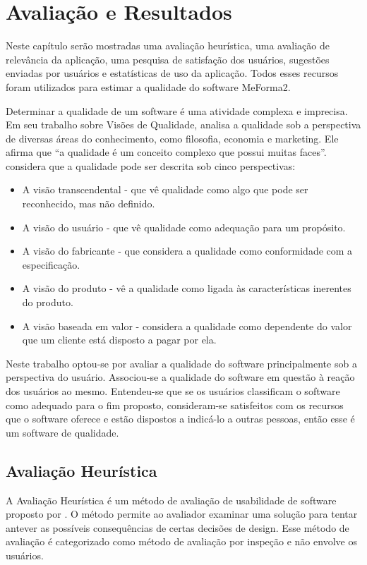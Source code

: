 \chapter{Avaliação e Resultados}
Neste capítulo serão mostradas uma avaliação heurística, uma avaliação de relevância da aplicação, uma pesquisa de satisfação dos usuários, sugestões enviadas por usuários e estatísticas de uso da aplicação. Todos esses recursos foram utilizados para estimar a qualidade do software MeForma2.

Determinar a qualidade de um software é uma atividade complexa e imprecisa. Em seu trabalho sobre Visões de Qualidade, \cite{garvin} analisa a qualidade sob a perspectiva de diversas áreas do conhecimento, como filosofia, economia e marketing. Ele afirma que ``a qualidade é um conceito complexo que possui muitas faces''. \cite{garvin} considera que a qualidade pode ser descrita sob cinco perspectivas: 
\begin{itemize}
    \item A visão transcendental - que vê qualidade como algo que pode ser reconhecido, mas não definido.
    \item A visão do usuário - que vê qualidade como adequação para um propósito.
    \item A visão do fabricante - que considera a qualidade como conformidade com a especificação.
    \item A visão do produto - vê a qualidade como ligada às características inerentes do produto.
    \item A visão baseada em valor - considera a qualidade como dependente do valor que um cliente está disposto a pagar por ela.
\end{itemize}

Neste trabalho optou-se por avaliar a qualidade do software principalmente sob a perspectiva do usuário. Associou-se a qualidade do software em questão à reação dos usuários ao mesmo. Entendeu-se que se os usuários classificam o software como adequado para o fim proposto, consideram-se satisfeitos com os recursos que o software oferece e estão dispostos a indicá-lo a outras pessoas, então esse é um software de qualidade.

\section{Avaliação Heurística}

A Avaliação Heurística é um método de avaliação de usabilidade de software proposto por \cite{nielsen}. O método permite ao avaliador examinar uma solução para tentar antever as possíveis consequências de certas decisões de design. Esse método de avaliação é categorizado como método de avaliação por inspeção e não envolve os usuários.


